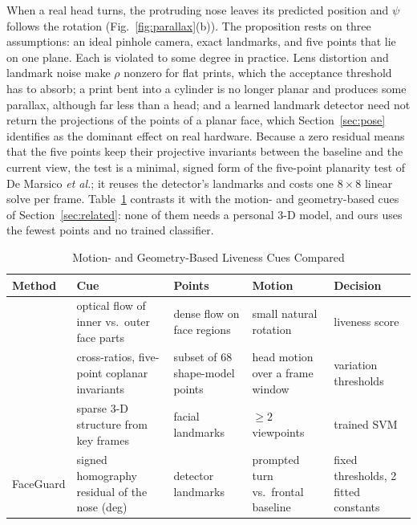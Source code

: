 \documentclass[journal]{IEEEtran}
\newcommand{\sys}{FaceGuard}
\begin{document}
When a real head turns, the protruding nose leaves its predicted position and $\psi$ follows the rotation (Fig.~\ref{fig:parallax}(b)). The proposition rests on three assumptions: an ideal pinhole camera, exact landmarks, and five points that lie on one plane. Each is violated to some degree in practice. Lens distortion and landmark noise make $\rho$ nonzero for flat prints, which the acceptance threshold has to absorb; a print bent into a cylinder is no longer planar and produces some parallax, although far less than a head; and a learned landmark detector need not return the projections of the points of a planar face, which Section~\ref{sec:pose} identifies as the dominant effect on real hardware. Because a zero residual means that the five points keep their projective invariants between the baseline and the current view, the test is a minimal, signed form of the five-point planarity test of De Marsico \emph{et al.}; it reuses the detector's landmarks and costs one $8\times8$ linear solve per frame. Table~\ref{tab:geo} contrasts it with the motion- and geometry-based cues of Section~\ref{sec:related}: none of them needs a personal 3-D model, and ours uses the fewest points and no trained classifier.

\begin{table}[!t]
\centering
\caption{Motion- and Geometry-Based Liveness Cues Compared}
\label{tab:geo}
\footnotesize
\setlength{\tabcolsep}{2pt}
\begin{tabular}{@{}>{\raggedright\arraybackslash}p{1.25cm}>{\raggedright\arraybackslash}p{2.05cm}>{\raggedright\arraybackslash}p{1.55cm}>{\raggedright\arraybackslash}p{1.55cm}>{\raggedright\arraybackslash}p{1.3cm}@{}}
\toprule
Method & Cue & Points & Motion & Decision \\
\midrule
{}\cite{kollreider2007motion} & optical flow of inner vs.\ outer face parts & dense flow on face regions & small natural rotation & liveness score \\
{}\cite{demarsico2012projective} & cross-ratios, five-point coplanar invariants & subset of 68 shape-model points & head motion over a frame window & variation thresholds \\
{}\cite{wang2013structure} & sparse 3-D structure from key frames & facial landmarks & ${\ge}2$ viewpoints & trained SVM \\
\sys{} & signed homography residual of the nose (deg) & 5 detector landmarks & prompted turn vs.\ frontal baseline & fixed thresholds, 2 fitted constants \\
\bottomrule
\end{tabular}
\end{table}
\end{document}
